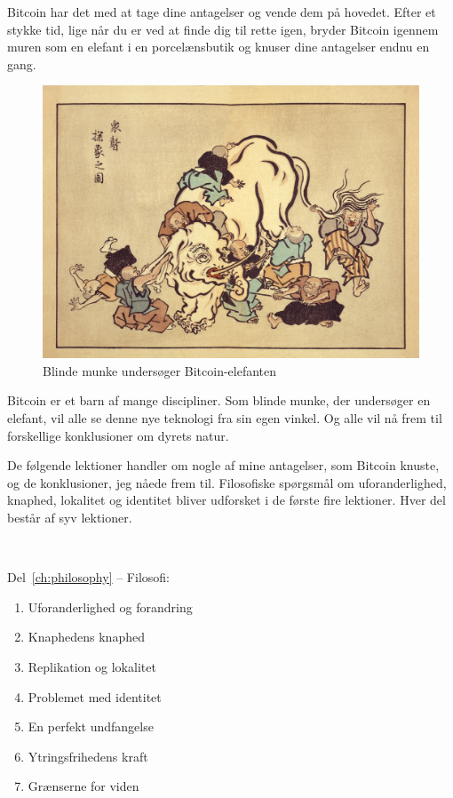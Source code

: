 \documentclass[paper=6in:9in,pagesize=pdftex,headinclude=on,footinclude=on,12pt]{scrbook}
\begin{document}
Bitcoin har det med at tage dine antagelser og vende dem på hovedet. Efter et stykke tid, lige når du er ved at finde dig til rette igen, bryder Bitcoin igennem muren som en elefant i en porcelænsbutik og knuser dine antagelser endnu en gang.\begin{figure}
  \includegraphics{assets/images/blind-monks.jpg}
  \caption{Blinde munke undersøger Bitcoin-elefanten}
  \label{fig:blind-monks}
\end{figure}

Bitcoin er et barn af mange discipliner. Som blinde munke, der undersøger en elefant, vil alle se denne nye teknologi fra sin egen vinkel. Og alle vil nå frem til forskellige konklusioner om dyrets natur.

De følgende lektioner handler om nogle af mine antagelser, som Bitcoin knuste, og de konklusioner, jeg nåede frem til. Filosofiske spørgsmål om uforanderlighed, knaphed, lokalitet og identitet bliver udforsket i de første fire lektioner. Hver del består af syv lektioner.

~\begin{samepage} Del~\ref{ch:philosophy} -- Filosofi:\begin{enumerate}
  \item Uforanderlighed og forandring \item Knaphedens knaphed \item Replikation og lokalitet \item Problemet med identitet \item En perfekt undfangelse \item Ytringsfrihedens kraft \item Grænserne for viden \end{enumerate}
\end{samepage}
\end{document}
